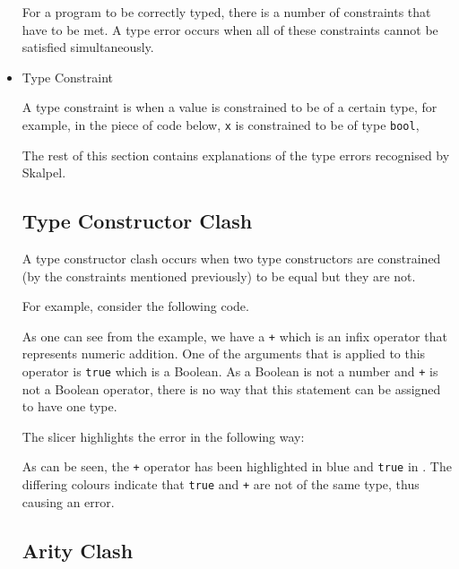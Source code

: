 \documentclass{report}
\begin{document}
\begin{itemize}
  \subitem For a program to be correctly typed, there is a number of
  constraints that have to be met. A type error occurs when all of
  these constraints cannot be satisfied simultaneously.


\item Type Constraint

  \subitem A type constraint is when a value is constrained to be of a
  certain type, for example, in the piece of code below, \texttt{x} is
  constrained to be of type \texttt{bool}, 

\newpage


{\large The rest of this section contains explanations of the type errors
recognised by Skalpel.}
\vspace{0.1in}
\subsection{Type Constructor Clash}

  \subitem A type constructor clash occurs when two type constructors
  are constrained (by the constraints mentioned previously) to be equal but
  they are not.

  For example, consider the following code.


As one can see from the example, we have a \texttt{+} which is
an infix operator that represents numeric addition. One of the
arguments that is applied to this operator is \texttt{true}
which is a Boolean. As a Boolean is not a number and \texttt{+}
is not a Boolean operator, there is no way that this statement can be
assigned to have one type.

The slicer highlights the error in the following way:


As can be seen, the \texttt{+} operator has been highlighted in blue and
\texttt{true} in \tesEndPointOne. The differing colours indicate that
\texttt{true} and \texttt{+} are not of the same type,
thus causing an error.

\newpage


\subsection{Arity Clash}


\end{itemize}
\end{document}
